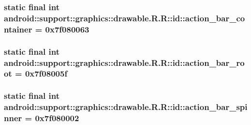 \hypertarget{classandroid_1_1support_1_1graphics_1_1drawable_1_1_r_1_1id_6208819cbc3a8c46236932aa49ec1fa3}{
\subsubsection[{action\_\-bar\_\-container}]{\setlength{\rightskip}{0pt plus 5cm}static final int android::support::graphics::drawable.R.R::id::action\_\-bar\_\-container = 0x7f080063}}
\label{classandroid_1_1support_1_1graphics_1_1drawable_1_1_r_1_1id_6208819cbc3a8c46236932aa49ec1fa3}


\hypertarget{classandroid_1_1support_1_1graphics_1_1drawable_1_1_r_1_1id_7106694835cde8dad5cbb5a0e472a4a2}{
\subsubsection[{action\_\-bar\_\-root}]{\setlength{\rightskip}{0pt plus 5cm}static final int android::support::graphics::drawable.R.R::id::action\_\-bar\_\-root = 0x7f08005f}}
\label{classandroid_1_1support_1_1graphics_1_1drawable_1_1_r_1_1id_7106694835cde8dad5cbb5a0e472a4a2}


\hypertarget{classandroid_1_1support_1_1graphics_1_1drawable_1_1_r_1_1id_16ff1e31fb56e360f2e1f5f41c049aac}{
\subsubsection[{action\_\-bar\_\-spinner}]{\setlength{\rightskip}{0pt plus 5cm}static final int android::support::graphics::drawable.R.R::id::action\_\-bar\_\-spinner = 0x7f080002}}
\label{classandroid_1_1support_1_1graphics_1_1drawable_1_1_r_1_1id_16ff1e31fb56e360f2e1f5f41c049aac}


